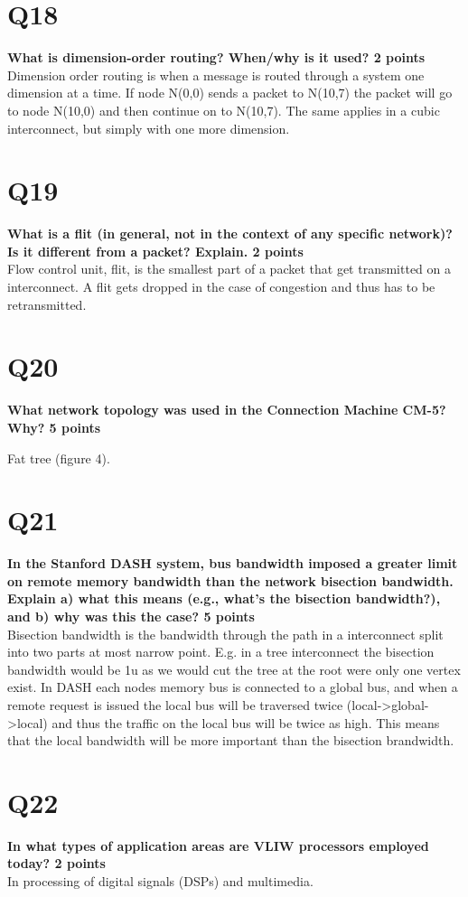 \documentclass[a4paper]{article}
\begin{document}
\section*{Q18}
\large{\textbf{
What is dimension-order routing? When/why is it used? 2 points\\}}
Dimension order routing is when a message is routed through a system one dimension at a time. If node N(0,0) sends a packet to N(10,7) the packet will go to node N(10,0) and then continue on to N(10,7). The same applies in a cubic interconnect, but simply with one more dimension.  

\section*{Q19}
\large{\textbf{
What is a flit (in general, not in the context of any specific network)? Is it different from a packet? Explain. 2 points\\}}
Flow control unit, flit, is the smallest part of a packet that get transmitted on a interconnect. A flit gets dropped in the case of congestion and thus has to be retransmitted.

\section*{Q20}
\large{\textbf{What network topology was used in the Connection Machine CM-5? Why? 5 points\\}}

Fat tree (figure 4). 

\section*{Q21}
\large{\textbf{
In the Stanford DASH system, bus bandwidth imposed a greater limit on remote memory bandwidth than the network bisection bandwidth. Explain a) what this means (e.g., what’s the bisection bandwidth?), and b) why was this the case? 5 points \\}}
Bisection bandwidth is the bandwidth through the path in a interconnect split into two parts at most narrow point. E.g. in a tree interconnect the bisection bandwidth would be 1u as we would cut the tree at the root were only one vertex exist. In DASH each nodes memory bus is connected to a global bus, and when a remote request is issued the local bus will be traversed twice (local->global->local) and thus the traffic on the local bus will be twice as high. This means that the local bandwidth will be more important than the bisection brandwidth.   

\section*{Q22}
\large{\textbf{In what types of application areas are VLIW processors employed today? 2 points\\}}
In processing of digital signals (DSPs) and multimedia.
\end{document}
